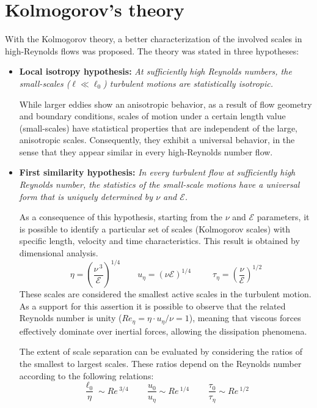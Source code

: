 \documentclass[12pt, a4paper, twoside, openright]{book}
\begin{document}
\section{Kolmogorov's theory}
With the Kolmogorov theory, a better characterization of the involved scales in high-Reynolds flows was proposed. The theory was stated in three hypotheses:
\begin{itemize}
	\item \textbf{Local isotropy hypothesis:} \textit{At sufficiently high Reynolds numbers, the small-scales ($\ell \ll \ell_0$) turbulent motions are statistically isotropic.}

	      While larger eddies show an anisotropic behavior, as a result of flow geometry and boundary conditions, scales of motion under a certain length value (small-scales) have statistical properties that are independent of the large, anisotropic scales. Consequently, they exhibit a universal behavior, in the sense that they appear similar in every high-Reynolds number flow.

	\item \textbf{First similarity hypothesis:} \textit{In every turbulent flow at sufficiently high Reynolds number, the statistics of the small-scale motions have a universal form that is uniquely determined by $\nu$ and $\mathcal{E}$.}

	      As a consequence of this hypothesis, starting from the $\nu$ and $\mathcal{E}$ parameters, it is possible to identify a particular set of scales (Kolmogorov scales) with specific length, velocity and time characteristics. This result is obtained by dimensional analysis.
	      \begin{equation}
		      \eta = \left( \frac{\nu \, ^3}{\mathcal{E}} \right)^{1/4} \qquad
		      u_\eta = (\nu \mathcal{E})^{1/4} \qquad \,\,\,
		      \tau_\eta = \left( \frac{\nu}{\mathcal{E}} \right)^{1/2}
	      \end{equation}
	      These scales are considered the smallest active scales in the turbulent motion. As a support for this assertion it is possible to observe that the related Reynolds number is unity ($Re_\eta = \eta \cdot u_\eta / \nu = 1$), meaning that viscous forces effectively dominate over inertial forces, allowing the dissipation phenomena.

	      The extent of scale separation can be evaluated by considering the ratios of the smallest to largest scales. These ratios depend on the Reynolds number according to the following relations:
	      \begin{equation}
		      \frac{\ell_0}{\eta} \sim Re\,^{3/4} \, \qquad
		      \frac{u_0}{u_\eta} \sim Re\,^{1/4} \, \qquad
		      \frac{\tau_0}{\tau_\eta} \sim Re\,^{1/2}
		      \label{eq:k41-scale-ratios}
	      \end{equation}


\end{itemize}
\end{document}
